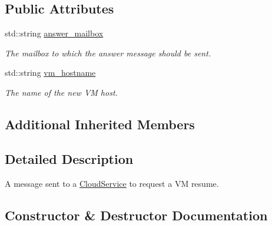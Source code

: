 \subsection*{Public Attributes}
\begin{DoxyCompactItemize}
\item 
\mbox{\label{classwrench_1_1_cloud_service_resume_v_m_request_message_a8bcb4ffbde216d0ec68dde391fc1f8d2}} 
std\+::string \hyperlink{classwrench_1_1_cloud_service_resume_v_m_request_message_a8bcb4ffbde216d0ec68dde391fc1f8d2}{answer\+\_\+mailbox}
\begin{DoxyCompactList}\small\item\em The mailbox to which the answer message should be sent. \end{DoxyCompactList}\item 
\mbox{\label{classwrench_1_1_cloud_service_resume_v_m_request_message_a77975278481b99f13380266ebf77f294}} 
std\+::string \hyperlink{classwrench_1_1_cloud_service_resume_v_m_request_message_a77975278481b99f13380266ebf77f294}{vm\+\_\+hostname}
\begin{DoxyCompactList}\small\item\em The name of the new VM host. \end{DoxyCompactList}\end{DoxyCompactItemize}
\subsection*{Additional Inherited Members}


\subsection{Detailed Description}
A message sent to a \hyperlink{classwrench_1_1_cloud_service}{Cloud\+Service} to request a VM resume. 

\subsection{Constructor \& Destructor Documentation}
\mbox{\label{classwrench_1_1_cloud_service_resume_v_m_request_message_aa9befbcf2e92ab3768cd6d222bbfe7a1}} 
